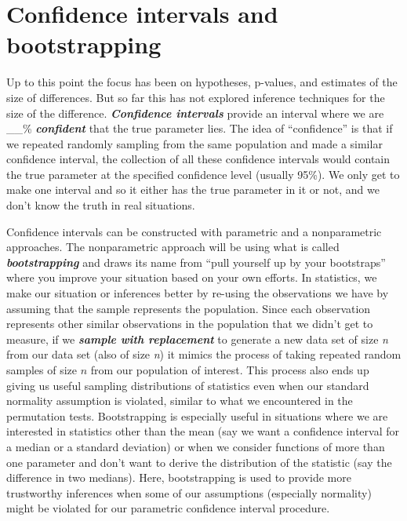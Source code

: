 \documentclass[
]{book}
\begin{document}
\hypertarget{section2-9}{%
\section{Confidence intervals and bootstrapping}\label{section2-9}}

Up to this point the focus has been on hypotheses, p-values, and estimates of the size of differences. But so far this has not explored inference techniques for the size of the difference. \textbf{\emph{Confidence intervals}} provide an interval where we are \_\_\% \textbf{\emph{confident}} that the true parameter lies.  The idea of ``confidence'' is that if we repeated randomly sampling from the same population and made a similar confidence interval, the collection of all these confidence intervals would contain the true parameter at the specified confidence level (usually 95\%). We only get to make one interval and so it either has the true parameter in it or not, and we don't know the truth in real situations.

\indent Confidence intervals can be constructed with parametric  and a
nonparametric approaches. The nonparametric 
approach will be using what is
called \textbf{\emph{bootstrapping}}
and draws its name from ``pull yourself up by
your bootstraps'' where you improve your situation based on your own efforts.
In statistics, we make our situation or inferences better by re-using the
observations we have by assuming that the sample represents the population.
Since each observation represents other similar observations in the
population that we didn't get to measure, if we \textbf{\emph{sample with replacement}}
to generate a new data set of size \emph{n} from our data set (also of size \emph{n})
it mimics the process of taking repeated random samples  of size \(n\) from our
population of interest. This process also
ends up giving us useful sampling distributions
of statistics even when our
standard normality assumption is violated, similar to what we encountered
in the permutation tests. Bootstrapping is especially useful in situations
where we are interested in statistics other than the mean (say we want a
confidence interval for a median or a standard deviation) or when we consider
functions of more than one parameter and don't want to derive the distribution
of the statistic (say the difference in two medians). Here,
bootstrapping is used to provide more trustworthy inferences when some of our
assumptions (especially normality) might be violated for our parametric confidence interval procedure.
\end{document}
